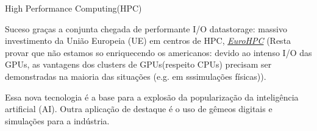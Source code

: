 \documentclass{beamer}
\begin{document}
\begin{frame}{High Performance Computing(HPC)}
		\vspace{0.3cm}
		
		Suceso graças a  conjunta  chegada de performante  I/O  datastorage:  massivo investimento da União Europeia (UE) em centros de HPC, \textcolor{blue}{\emph{\href{https://eurohpc-ju.europa.eu/index_en}{EuroHPC}}}
		(Resta provar que não estamos so enriquecendo os americanos: devido ao intenso I/O das GPUs, as vantagens dos clusters de GPUs(respeito CPUs) precisam ser demonstradas na maioria das situações (e.g. em sssimulações físicas)).
		
		\vspace{0.3cm}
		Essa nova tecnologia é a base para a explosão da popularização da inteligência artificial (AI). Outra aplicação de destaque é o uso de gêmeos digitais e simulações para a indústria.
		

	\end{frame}
	

	
\end{document}
